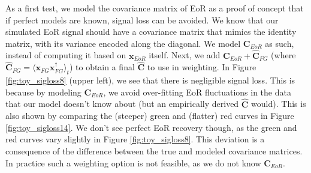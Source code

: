 \documentclass[preprint2,numberedappendix,tighten]{aastex6}  %
\begin{document}
As a first test, we model the covariance matrix of EoR as a proof of concept that if perfect models are known, signal loss can be 
avoided. We know that our simulated EoR signal should have a covariance matrix that mimics the identity matrix, with its 
variance encoded along the diagonal. We model $\textbf{C}_{EoR}$ as such, instead of computing it based on $\textbf{x}
_{EoR}$ itself. Next, we add $\textbf{C}_{EoR} + \hat{\textbf{C}}_{FG}$ (where $\hat{\textbf{C}}_{FG} = \langle\textbf{x}_{FG}
\textbf{x}_{FG}^{\dagger}\rangle_{t}$) to obtain a final $\hat{\textbf{C}}$ to use in weighting. In Figure \ref{fig:toy_sigloss8} (upper 
left), we see that there is negligible signal loss. This is because by modeling $\textbf{C}_{EoR}$, we avoid over-fitting EoR fluctuations in the data that our model doesn't know about (but an empirically derived $\hat{\textbf{C}}$ would). This is also shown by comparing the (steeper) green and (flatter) red curves in Figure \ref{fig:toy_sigloss14}. We don't see perfect EoR recovery though, as the 
green and red curves vary slightly in Figure \ref{fig:toy_sigloss8}. This deviation is a consequence of the difference between the 
true and modeled covariance matrices. In practice such a weighting option is not feasible, as we do not know $\textbf{C}_{EoR}
$.
\end{document}
